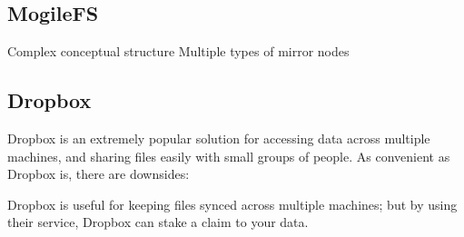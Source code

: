 \documentclass[12pt,a4paper,]{adreport}
\begin{document}
\subsection{MogileFS}\label{mogilefs}

Complex conceptual structure Multiple types of mirror nodes

\subsection{Dropbox}\label{dropbox}

Dropbox is an extremely popular solution for accessing data across
multiple machines, and sharing files easily with small groups of people.
As convenient as Dropbox is, there are downsides:

Dropbox is useful for keeping files synced across multiple machines; but
by using their service, Dropbox can stake a claim to your data.
\end{document}
